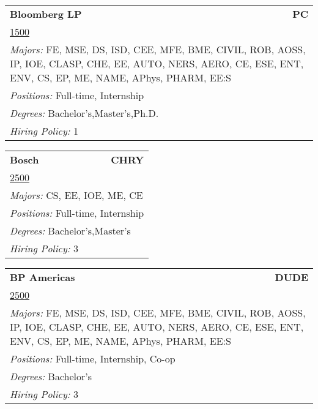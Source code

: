 \documentclass[twoside]{article}
\begin{document}
\begin{center}
\begin{multicols}{3}
\begin{FlushLeft}
\begin{minipage}{\columnwidth}\begin{tabularx}{.95\columnwidth}{Xr}
                 {\Large\bf Bloomberg LP} & {\Large\bf PC}\\
    \multicolumn{2}{p{.95\columnwidth}}{\url{1500}}\\
    \multicolumn{2}{p{.95\columnwidth}}{\emph{Majors:} FE, MSE, DS, ISD, CEE, MFE, BME, CIVIL, ROB, AOSS, IP, IOE, CLASP, CHE, EE, AUTO, NERS, AERO, CE, ESE, ENT, ENV, CS, EP, ME, NAME, APhys, PHARM, EE:S}\\
    \multicolumn{2}{p{.95\columnwidth}}{\emph{Positions:} Full-time, Internship}\\
    \multicolumn{2}{p{.95\columnwidth}}{\emph{Degrees:} Bachelor's,Master's,Ph.D.}\\
    \multicolumn{2}{p{.95\columnwidth}}{\emph{Hiring Policy:} 1}\\
    \end{tabularx}
    
\end{minipage}
 
\begin{minipage}{\columnwidth}\begin{tabularx}{.95\columnwidth}{Xr}
                 {\Large\bf Bosch} & {\Large\bf CHRY}\\
    \multicolumn{2}{p{.95\columnwidth}}{\url{2500}}\\
    \multicolumn{2}{p{.95\columnwidth}}{\emph{Majors:} CS, EE, IOE, ME, CE}\\
    \multicolumn{2}{p{.95\columnwidth}}{\emph{Positions:} Full-time, Internship}\\
    \multicolumn{2}{p{.95\columnwidth}}{\emph{Degrees:} Bachelor's,Master's}\\
    \multicolumn{2}{p{.95\columnwidth}}{\emph{Hiring Policy:} 3}\\
    \end{tabularx}
    
\end{minipage}
 
\begin{minipage}{\columnwidth}\begin{tabularx}{.95\columnwidth}{Xr}
                 {\Large\bf BP Americas} & {\Large\bf DUDE}\\
    \multicolumn{2}{p{.95\columnwidth}}{\url{2500}}\\
    \multicolumn{2}{p{.95\columnwidth}}{\emph{Majors:} FE, MSE, DS, ISD, CEE, MFE, BME, CIVIL, ROB, AOSS, IP, IOE, CLASP, CHE, EE, AUTO, NERS, AERO, CE, ESE, ENT, ENV, CS, EP, ME, NAME, APhys, PHARM, EE:S}\\
    \multicolumn{2}{p{.95\columnwidth}}{\emph{Positions:} Full-time, Internship, Co-op}\\
    \multicolumn{2}{p{.95\columnwidth}}{\emph{Degrees:} Bachelor's}\\
    \multicolumn{2}{p{.95\columnwidth}}{\emph{Hiring Policy:} 3}\\
    \end{tabularx}
    

\end{minipage}
\end{FlushLeft}
\end{multicols}
\end{center}
\end{document}
